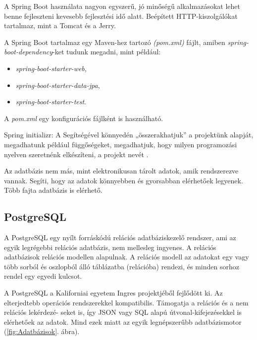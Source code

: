 A Spring Boot használata nagyon egyszerű, jó minőségű alkalmazásokat lehet benne fejleszteni kevesebb fejlesztési idő alatt. Beépített HTTP-kiszolgálókat tartalmaz, mint a Tomcat és a Jerry.

A Spring Boot tartalmaz egy Maven-hez tartozó \textit{(pom.xml)} fájlt, amiben \textit{spring-boot-dependency}-ket tudunk megadni, mint például:

\begin{itemize}
\item \textit{spring-boot-starter-web},
\item \textit{spring-boot-starter-data-jpa},
\item \textit{spring-boot-starter-test}.
\end{itemize}

A \textit{pom.xml} egy konfigurációs fájlként is használható.

Spring initializr: A Segítségével könnyedén „összerakhatjuk” a projektünk alapját, megadhatunk például függőségeket, megadhatjuk, hogy milyen programozási nyelven szeretnénk elkészíteni, a projekt nevét \cite{SpringBoot}.

Az adatbázis nem más, mint elektronikusan tárolt adatok, amik rendszerezve vannak. Segíti, hogy az adatok könnyebben és gyorsabban elérhetőek legyenek. Több fajta adatbázis is elérhető.


\subsection{PostgreSQL}

A PostgreSQL \cite{PostgreSQL} egy nyílt forráskódú relációs adatbáziskezelő rendszer, ami az egyik legrégebbi relációs adatbázis, nem mellesleg ingyenes. A relációs adatbázisok relációs modellen alapulnak. A relációs modell az adatokat egy vagy több sorból és oszlopból álló táblázatba (relációba) rendezi, és minden sorhoz rendel egy egyedi kulcsot.

A PostgreSQL a Kaliforniai egyetem Ingres projektjéből fejlődött ki. Az elterjedtebb operációs rendszerekkel kompatibilis. Támogatja a relációs és a nem relációs lekérdezé-
seket is, így JSON vagy SQL alapú útvonal-kifejezésekkel is elérhetőek az adatok.  Mind ezek miatt az egyik legnépszerűbb adatbázismotor (\ref{fig:Adatbázisok}. ábra).

